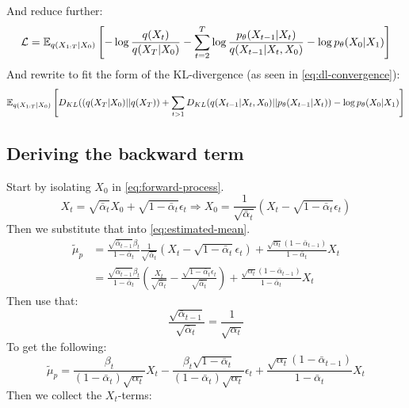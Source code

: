 And reduce further:
\begin{equation}
    \mathcal{L}=\mathbb{E}_{q(X_{1:T}|X_0)} \left[ -\log \frac{q(X_t)}{q(X_T|X_0)} -\sum_{t=2}^T \log \frac{ p_{\theta} (X_{t-1}|X_t)}{ q(X_{t-1}|X_{t}, X_0)} - \log p_{\theta} (X_{0}|X_1) \right]
\end{equation}
And rewrite to fit the form of the KL-divergence (as seen in \autoref{eq:dl-convergence}):
\begin{equation}
    \mathbb{E}_{q(X_{1:T}|X_0)} 
    \left[ 
        D_{KL} ( (q(X_T|X_0) || q(X_T)) +
        \sum_{t>1} D_{KL} ( q(X_{t-1} | X_t, X_0) || p_{\theta}(X_{t-1}|X_t) ) -
        \log p_{\theta} (X_0|X_1)
    \right]
\end{equation}

\subsection{Deriving the backward term} \label{ap:backward-term}
Start by isolating $X_0$ in \cref{eq:forward-process}.
\begin{equation}
    X_t = \sqrt{\bar{\alpha}_t}X_0 + \sqrt{1-\bar{\alpha}_t}\epsilon_t \Rightarrow X_0 = \frac{1}{\sqrt{\bar{\alpha}_t}}(X_t - \sqrt{1-\bar{\alpha}_t} \epsilon_t)
\end{equation}
Then we substitute that into \cref{eq:estimated-mean}.
\begin{align}
    \tilde{\mu}_p &= \frac{\sqrt{\bar{\alpha}_{t-1}}\beta_t}{1-\bar{\alpha}_t} \frac{1}{\sqrt{\bar{\alpha}_t}} \left(X_t - \sqrt{1-\bar{\alpha}_t} \epsilon_t \right) + \frac{\sqrt{\alpha_t}(1-\bar{\alpha}_{t-1})}{1-\bar{\alpha}_t}X_t \\
    &= \frac{\sqrt{\bar{\alpha}_{t-1}}\beta_t}{1-\bar{\alpha}_t} \left( \frac{X_t}{\sqrt{\bar{\alpha}_t}} - \frac{\sqrt{1-\bar{\alpha}_t} \epsilon_t}{\sqrt{\bar{\alpha}_t}} \right) + \frac{\sqrt{\alpha_t}(1-\bar{\alpha}_{t-1})}{1-\bar{\alpha}_t}X_t
\end{align}
Then use that:
\begin{equation}
    \frac{\sqrt{\bar{\alpha}_{t-1}}}{\sqrt{\bar{\alpha}_t}} = \frac{1}{\sqrt{\alpha_t}}
\end{equation}
To get the following:
\begin{equation}
    \tilde{\mu}_p = \frac{\beta_t}{(1-\bar{\alpha}_t) \sqrt{\alpha_t}} X_t - \frac{\beta_t \sqrt{1-\bar{\alpha}_t} }{(1-\bar{\alpha}_t) \sqrt{\alpha_t}} \epsilon_t + \frac{\sqrt{\alpha_t}(1-\bar{\alpha}_{t-1})}{1-\bar{\alpha}_t}X_t
\end{equation}
Then we collect the $X_t$-terms:
